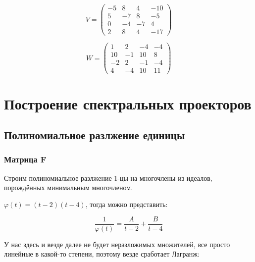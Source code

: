 \documentclass[12pt, a4paper]{article}
\begin{document}
\begin{statement}
        \begin{equation}
            V = \left(\begin{matrix}
                -5 & 8 & 4 & -10 \\
                5 & -7 & 8 & -5 \\
                0 & -4 & -7 & 4 \\
                2 & 8 & 4 & -17
            \end{matrix}\right)
        \end{equation}

        
        \begin{equation}
            W = \left(\begin{matrix}
                1 & 2 & -4 & -4 \\
                10 & -1 & 10 & 8 \\
                -2 & 2 & -1 & -4 \\
                4 & -4 & 10 & 11
            \end{matrix}\right)
        \end{equation}
    \end{statement}


    \section{Построение спектральных проекторов}

    \subsection{Полиномиальное разлжение единицы}

    \subsubsection{Матрица F}

    Строим полиномиальное разлжение 1-цы на многочлены из идеалов, порождённых минимальным многочленом.
    
    $\varphi(t) = (t - 2)(t - 4)$, тогда можно представить: 
    
    \begin{equation}
        \frac{1}{\varphi(t)} = \frac{A}{t - 2} + \frac{B}{t - 4}
    \end{equation}

    У нас здесь и везде далее не будет неразложимых множителей, 
    все просто линейные в какой-то степени, поэтому везде сработает Лагранж:
\end{document}
